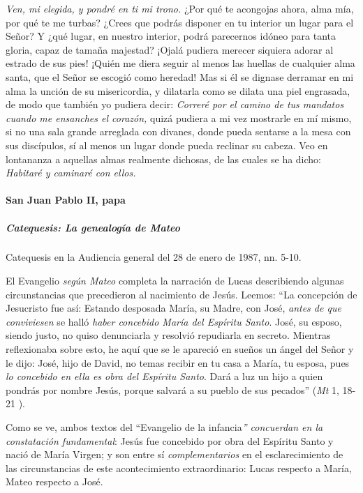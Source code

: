 \documentclass[]{article}
\let\oldparagraph\paragraph
\renewcommand{\paragraph}[1]{\oldparagraph{#1}\mbox{}}
\let\oldsubparagraph\subparagraph
\renewcommand{\subparagraph}[1]{\oldsubparagraph{#1}\mbox{}}
\begin{document}
\emph{Ven, mi elegida, y pondré en ti mi trono.} ¿Por qué te acongojas
ahora, alma mía, por qué te me turbas? ¿Crees que podrás disponer en tu
interior un lugar para el Señor? Y ¿qué lugar, en nuestro interior,
podrá parecernos idóneo para tanta gloria, capaz de tamaña majestad?
¡Ojalá pudiera merecer siquiera adorar al estrado de sus pies! ¡Quién me
diera seguir al menos las huellas de cualquier alma santa, que el Señor
se escogió como heredad! Mas si él se dignase derramar en mi alma la
unción de su misericordia, y dilatarla como se dilata una piel
engrasada, de modo que también yo pudiera decir: \emph{Correré por el
camino de tus mandatos cuando me ensanches el corazón,} quizá pudiera a
mi vez mostrarle en mí mismo, si no una sala grande arreglada con
divanes, donde pueda sentarse a la mesa con sus discípulos, sí al menos
un lugar donde pueda reclinar su cabeza. Veo en lontananza a aquellas
almas realmente dichosas, de las cuales se ha dicho: \emph{Habitaré y
caminaré con
ellos.}\protect\hypertarget{_Toc448662967}{}{\protect\hypertarget{_Toc448690486}{}{\protect\hypertarget{_Toc448708509}{}{\protect\hypertarget{_Toc448709595}{}{}}}}

\paragraph{San Juan Pablo II, papa}\label{san-juan-pablo-ii-papa-4}

\subparagraph{Catequesis: La genealogía de
Mateo}\label{catequesis-la-genealoguxeda-de-mateo}

Catequesis en la Audiencia general del 28 de enero de 1987, nn. 5-10.

El Evangelio \emph{según Mateo} completa la narración de Lucas
describiendo algunas circunstancias que precedieron al nacimiento de
Jesús. Leemos: ``La concepción de Jesucristo fue así: Estando desposada
María, su Madre, con José, \emph{antes de que conviviesen} se halló
\emph{haber concebido María del Espíritu Santo}. José, su esposo, siendo
justo, no quiso denunciarla y resolvió repudiarla en secreto. Mientras
reflexionaba sobre esto, he aquí que se le apareció en sueños un ángel
del Señor y le dijo: José, hijo de David, no temas recibir en tu casa a
María, tu esposa, pues \emph{lo concebido en ella es obra del Espíritu
Santo}. Dará a luz un hijo a quien pondrás por nombre Jesús, porque
salvará a su pueblo de sus pecados'' (\emph{Mt} 1, 18-21 ).

Como se ve, ambos textos del ``Evangelio de la infancia\emph{''
concuerdan en la constatación fundamental}: Jesús fue concebido por obra
del Espíritu Santo y nació de María Virgen; y son entre sí
\emph{complementarios} en el esclarecimiento de las circunstancias de
este acontecimiento extraordinario: Lucas respecto a María, Mateo
respecto a José.
\end{document}
